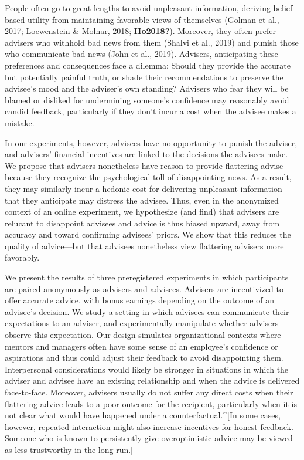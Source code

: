 \documentclass[
  man,
  floatsintext,
  longtable,
  nolmodern,
  notxfonts,
  notimes,
  colorlinks=true,linkcolor=blue,citecolor=blue,urlcolor=blue]{apa7}
\begin{document}
People often go to great lengths to avoid unpleasant information,
deriving belief-based utility from maintaining favorable views of
themselves (Golman et al., 2017; Loewenstein \& Molnar, 2018;
\textbf{Ho2018?}). Moreover, they often prefer advisers who withhold bad
news from them (Shalvi et al., 2019) and punish those who communicate
bad news (John et al., 2019). Advisers, anticipating these preferences
and consequences face a dilemma: Should they provide the accurate but
potentially painful truth, or shade their recommendations to preserve
the advisee's mood and the adviser's own standing? Advisers who fear
they will be blamed or disliked for undermining someone's confidence may
reasonably avoid candid feedback, particularly if they don't incur a
cost when the advisee makes a mistake.

In our experiments, however, advisees have no opportunity to punish the
adviser, and advisers' financial incentives are linked to the decisions
the advisees make. We propose that advisers nonetheless have reason to
provide flattering advise because they recognize the psychological toll
of disappointing news. As a result, they may similarly incur a hedonic
cost for delivering unpleasant information that they anticipate may
distress the advisee. Thus, even in the anonymized context of an online
experiment, we hypothesize (and find) that advisers are relucant to
disappoint advisees and advice is thus biased upward, away from accuracy
and toward confirming advisees' priors. We show that this reduces the
quality of advice---but that advisees nonetheless view flattering
advisers more favorably.

We present the results of three preregistered experiments in which
participants are paired anonymously as advisers and advisees. Advisers
are incentivized to offer accurate advice, with bonus earnings depending
on the outcome of an advisee's decision. We study a setting in which
advisees can communicate their expectations to an adviser, and
experimentally manipulate whether advisers observe this expectation. Our
design simulates organizational contexts where mentors and managers
often have some sense of an employee's confidence or aspirations and
thus could adjust their feedback to avoid disappointing them.
Interpersonal considerations would likely be stronger in situations in
which the adviser and advisee have an existing relationship and when the
advice is delivered face-to-face. Moreover, advisers usually do not
suffer any direct costs when their flattering advice leads to a poor
outcome for the recipient, particularly when it is not clear what would
have happened under a counterfactual.\^{}{[}In some cases, however,
repeated interaction might also increase incentives for honest feedback.
Someone who is known to persistently give overoptimistic advice may be
viewed as less trustworthy in the long run.{]}
\end{document}

